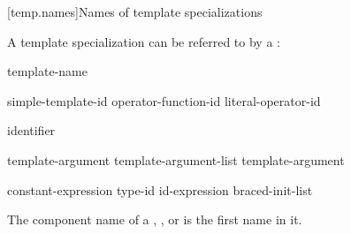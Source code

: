 [temp.names]{Names of template specializations}

\pnum
A template specialization can be referred to by a
:

\begin{bnf}
\br
  template-name \terminal{<}  \terminal{>}
\end{bnf}

\begin{bnf}
\br
  simple-template-id\br
  operator-function-id \terminal{<}  \terminal{>}\br
  literal-operator-id \terminal{<}  \terminal{>}
\end{bnf}

\begin{bnf}
\br
  identifier
\end{bnf}

\begin{bnf}
\br
  template-argument \br
  template-argument-list \terminal{,} template-argument 
\end{bnf}

\begin{bnf}
\br
  constant-expression\br
  type-id\br
  id-expression\br
  braced-init-list
\end{bnf}

\pnum
{}%
The component name of a
,
, or
is the first name in it.

